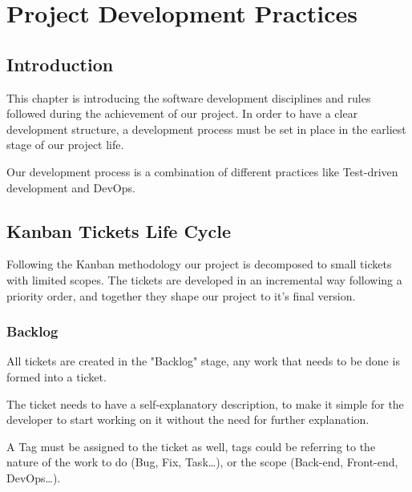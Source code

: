
\setcounter{chapter}{1}
\chapter{Project Development Practices}
\minitoc %
\graphicspath{{Chapitre2/figures/}}


\pagestyle{fancy}
\fancyhf{}
\fancyhead[R]{\bfseries\rightmark}
\fancyfoot[R]{\thepage}
\renewcommand{\headrulewidth}{0.5pt}
\renewcommand{\footrulewidth}{0pt}
\renewcommand{\chaptermark}[1]{\markboth{\MakeUppercase{\chaptername~\thechapter. #1 }}{}}
\renewcommand{\sectionmark}[1]{\markright{\thechapter.\thesection~ #1}}

\begin{spacing}{1.2}
\section*{Introduction} 
This chapter is introducing the software development disciplines and rules followed during the achievement of our project. In order to have a clear development structure, a development process must be set in place in the earliest stage of our project life.

Our development process is a combination of different practices like Test-driven development and DevOps.

\section{Kanban Tickets Life Cycle}
Following the Kanban methodology our project is decomposed to small tickets with limited scopes. The tickets are developed in an incremental way following a priority order, and together they shape our project to it's final version.
\subsection{Backlog}
All tickets are created in the "Backlog" stage, any work that needs to be done is formed into a ticket.


The ticket needs to have a self-explanatory description, to make it simple for the developer to start working on it without the need for further explanation.

A Tag must be assigned to the ticket as well, tags could be referring to the nature of the work to do (Bug, Fix, Task\dots), or the scope (Back-end, Front-end, DevOps\dots).


\end{spacing}
